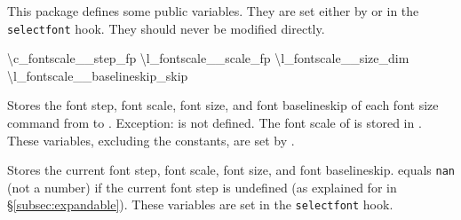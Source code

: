 \documentclass{beery}
\begin{document}
This package defines some public  variables.
They are set either by  or in the \texttt{selectfont} hook.
They should never be modified directly.

\begin{mydisplaycode}
  \ttfamily
  \textbackslash{}c\_fontscale\_\_step\_fp
  \nopagebreak\newline
  \textbackslash{}l\_fontscale\_\_scale\_fp
  \newline
  \textbackslash{}l\_fontscale\_\_size\_dim
  \nopagebreak\newline
  \textbackslash{}l\_fontscale\_\_baselineskip\_skip
\end{mydisplaycode}

Stores the font step, font scale, font size, and font baselineskip of each font size command from  to .
Exception:
 is not defined.
The font scale of  is stored in .
These variables, excluding the constants, are set by .

\begin{mydisplaycode}
  \nopagebreak\newline
  \newline
  \nopagebreak\newline
\end{mydisplaycode}

Stores the current font step, font scale, font size, and font baselineskip.
 equals \texttt{nan} (not a number) if the current font step is undefined (as explained for  in \S\ref{subsec:expandable}).
These variables are set in the \texttt{selectfont} hook.
\end{document}
